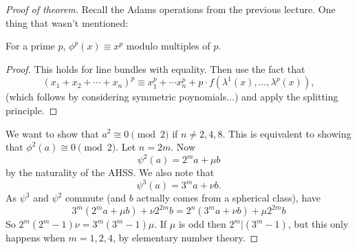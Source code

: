 \documentclass[11pt]{article}
\begin{document}
\begin{MarkusHopfInvOne}
\begin{proof}[Proof of theorem]
Recall the Adams operations from the previous lecture. One thing that wasn't mentioned:
\begin{lem*}
For a prime $p$, $\phi^p(x)\equiv x^p$ modulo multiples of $p$.
\end{lem*}
\begin{proof}
This holds for line bundles with equality. Then use the fact that %
\[(x_1+x_2+\cdots+x_n)^p\equiv x_1^p+\cdots x_n^p+p\cdot f(\lambda^1(x),\ldots,\lambda^p(x)),\] (which follows by considering symmetric poynomials...) and apply the splitting principle.
\end{proof}
We want to show that $a^2\cong 0\pmod{2}$ if $n\neq2,4,8$. This is equivalent to showing that $\phi^2(a)\cong 0\pmod{2}$. Let $n=2m$. Now
\[\psi^2(a)=2^ma+\mu b\]
by the naturality of the AHSS. We also note that
\[\psi^3(a)=3^ma+\nu b.\]
As $\psi^3$ and $\psi^2$ commute (and $b$ actually comes from a spherical class), have
\[3^m(2^ma+\mu b)+\nu 2^{2m}b=2^n(3^ma+\nu b)+\mu2^{2m}b\]
So $2^m(2^m-1)\nu= 3^m(3^{m}-1)\mu$.
If $\mu$ is odd then $2^m|(3^{m}-1)$, but this only happens when $m=1,2,4$, by elementary number theory.
\end{proof}


\pagebreak
\end{MarkusHopfInvOne}
\end{document}
